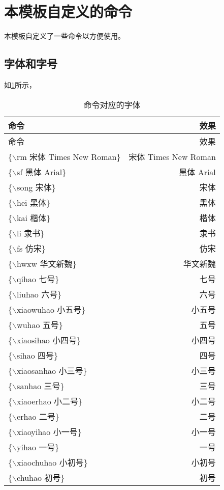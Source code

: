 \section{本模板自定义的命令}
本模板自定义了一些命令以方便使用。

\subsection{字体和字号}
如\cref{zt}所示，
    
\begin{longtable}{lr}
	\caption{命令对应的字体\label{zt}}\\
	\hline
	 命令 & 效果\\
	\hline
	\endfirsthead %
	\hline
	 命令 & 效果\\
	\hline
	\endhead %
	\hline   %
	\endfoot %
	\{$\backslash$rm 宋体 Times New Roman\} & {\rm 宋体 Times New Roman}\\
	\{$\backslash$sf 黑体 Arial\} & {\sf 黑体 Arial}\\
	\{$\backslash$song 宋体\} & {\song 宋体}\\
	\{$\backslash$hei 黑体\} & {\hei 黑体}\\
	\{$\backslash$kai 楷体\} & {\kai 楷体}\\
	\{$\backslash$li 隶书\} & {\li 隶书}\\
	\{$\backslash$fs 仿宋\} & {\fs 仿宋}\\ 
	\{$\backslash$hwxw 华文新魏\} &{\hwxw 华文新魏}\\
	\{$\backslash$qihao 七号\} & {\qihao 七号}\\
	\{$\backslash$liuhao 六号\} & {\liuhao 六号}\\
	\{$\backslash$xiaowuhao 小五号\} & {\xiaowuhao 小五号}\\
	\{$\backslash$wuhao 五号\} & {\wuhao 五号}\\
	\{$\backslash$xiaosihao 小四号\} & {\xiaosihao 小四号}\\
	\{$\backslash$sihao 四号\} & {\sihao 四号}\\
	\{$\backslash$xiaosanhao 小三号\} & {\xiaosanhao 小三号}\\
	\{$\backslash$sanhao 三号\} & {\sanhao 三号}\\
	\{$\backslash$xiaoerhao 小二号\} & {\xiaoerhao 小二号}\\
	\{$\backslash$erhao 二号\} & {\erhao 二号}\\
	\{$\backslash$xiaoyihao 小一号\} & {\xiaoyihao 小一号}\\
	\{$\backslash$yihao 一号\} & {\yihao 一号}\\
	\{$\backslash$xiaochuhao 小初号\} & {\xiaochuhao 小初号}\\
	\{$\backslash$chuhao 初号\} & {\chuhao 初号} \\
	\hline
\end{longtable}

